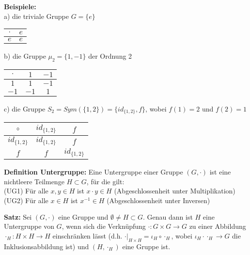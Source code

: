 \documentclass[11pt]{article}
\begin{document}
		\textbf{Beispiele:} \\
		a) die triviale Gruppe $G=\{e\}$
		\begin{center}
			\begin{tabular}{|c|c|}
				\hline
				$\cdot$ & $e$\\
				\hline
				$e$ & $e$ \\
				\hline
			\end{tabular}
		\end{center}
		b) die Gruppe $\mu_2 = \{1,-1\}$ der Ordnung 2
		\begin{center}
			\begin{tabular}{|c|c|c|}
				\hline
				$\cdot$ & $1$ & $-1$\\
				\hline
				$1$ & $1$ & $-1$ \\
				\hline
				$-1$ & $-1$ & $1$ \\
				\hline
			\end{tabular}
		\end{center}
		c) die Gruppe $S_2= Sym(\{1,2\}) = \{id_{\{1,2\}},f\}$, wobei $f(1)=2$ und $f(2)=1$
		\begin{center}
			\begin{tabular}{|c|c|c|}
				\hline
				$\circ$ & $id_{\{1,2\}}$ & $f$\\
				\hline
				$id_{\{1,2\}}$ & $id_{\{1,2\}}$ & $f$ \\
				\hline
				$f$ & $f$ & $id_{\{1,2\}}$ \\
				\hline
			\end{tabular}
		\end{center}
		
		\begin{framed}
			\textbf{Definition Untergruppe:} Eine Untergruppe einer Gruppe $(G,\cdot)$ ist eine 
			nichtleere Teilmenge $H \subset G$, f\"ur die gilt: \\
			(UG1) F\"ur alle $x,y \in H$ ist $x \cdot y \in H$ (Abgeschlossenheit unter Multiplikation) \\
			(UG2) F\"ur alle $x \in H$ ist $x^{-1} \in H$ (Abgeschlossenheit unter Inversen)
		\end{framed}
		
		\begin{framed}
			\textbf{Satz:} Sei $(G,\cdot)$ eine Gruppe und $\emptyset \neq H \subset G$. Genau dann ist
			$H$ eine Untergruppe von $G$, wenn sich die Verkn\"upfung $\cdot: G \times G \to G$ zu einer
			Abbildung $\cdot_H: H \times H \to H$ einschr\"anken l\"asst (d.h. $\cdot|_{H \times H}=
			\iota_H \circ \cdot_H$, wobei $\iota_H \cdot \cdot_H \to G$ die Inklusionsabbildung ist) und
			$(H,\cdot_H)$ eine Gruppe ist.
		\end{framed}
		
\end{document}
